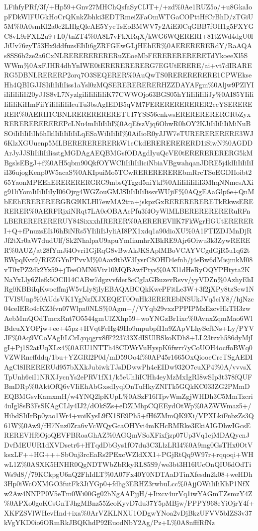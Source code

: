 \documentclass[]{article}
\begin{document}
LFihfyPRf/3f/+Hp59+Gnv27MHChQsfaSyCIJT+/+zd\%0Ae1RUZ5o/+u8GkaIopFDkWlFUGkHoCrQKnkZbhki3EDTRmeiZFaOmWTGaCOPttHfCrBhD/zTGiU5M\%0A0smKl2a0c2LHlgQleAE5YycTsEoBMWV7y2AiEi0CqGBB7fOH1g5FXYGC8vL9rFXL2u9+L0/tnZT4\%0A8L7vFkXRqX/kWG6WQERERI+81tZWd4dgU0lJiUv76zyT53Hx9ddfuzsEIiIi6gZRFGEwGLjHEhER\%0AERERERERdY/RaAQAs8SS6b2ze2a6CxNLRERERERERERuZEoeMbFERERERERERETdYkoeeXl5SWWm\%0AxFJHR4dbYnIWE0tERERERERERG7EGUtERERE/ai+vt7dIRARERG5DBNLRERERP2orq7O3SEQERER\%0AuQwTS0RERERERERE1CPWEkseHh4QBIGJJSIiIiIiIiIiss1aYsl0zMQSERERERERERHZZDAYAFgm\%0Aljw9PZlYIiIiIiIiIiIi20yJJS8vL7NyzlgiIiIiIiIiIiK77CWWOjo63BGS05hYIiIiIiIiIiJy\%0AI85YIiIiIiIiIiKiHmFiiYiIiIiIiIiIeuTu3bsAgIEDB5qVM7FERERERERERER2ccYSERERERER\%0AERH1CBNLRERERERERETUI7YSS56enkwsERERERERERGRbZyxREREREREREREPcLNu4mIiIiIiIiI\%0AqEfszVjq6OhwR0hOY2KJiIiIiIiIiMiNuBSOiIiIiIiIiIh6hIklIiIiIiIiIiLqESaWiIiIiIiI\%0AiIioR0yJJW7eTURERERERERE3WJ6KlzXGUuenp5MLBERERERERERkW1cCkdERERERERERD1iSiwN\%0AGDDArJyJJSIiIiIiIiIisstgMGDAgAEQBMGsfODAgdIyuQcVE0tERERERERERG5kMBgslsEBgJ+f\%0AH5qbm90QkfOYWCIiIiIiIiIiciNbiaVBgwahqanJDRE5j4klIiIiIiIiIiI36ujogKenp0W5acaS\%0AKIpuiMo5TCwREREREREREbmRrcTSoEGDIIoibt265YaonMPEEhERERERERGRG9mbsQTggd5niYkl\%0AIiIiIiIiIiI3MhqNNmcsAXig91liYomIiIiIiIiIyI06Ojrg4WGZouGMJSIiIiIiIiIissvWUjiF\%0AQgEAaGlp6e+QnMbEEhERERERERGRG9lKLHl7ewMA2tra+jskpzGxRERERERERETkRkwsERERERER\%0AERFRjxiNRqt7LA0cOBAAcPfu3f4OyWlMLBERERERERERuRFnLBERERERERERUY84SixxxhIRERER\%0AEREREVllK7FkWgrHGUtERERERI+Q+fPnuzsEIiJ6hBiNRs5YIiIiIiJyliAI8PX1xdq1a90dioXU\%0A1FTIZDJMnDjRJf2tXr0aW7dudUlf/Sk2NhalpaU9apuYmIiamhrXBkRE9Ajr6Oiwu3k3ZywRERER\%0AUZ/at28fYmJi4Ovri1GjRqG8vBwAkJKSAplMBoVCAYVCgdGjR5u1q62tRWpqKvz9/REZGYnPPvvM\%0Aav9tbW3IysrC8OHD4efnh/j4eBw6dMisjmkM08vT0xPZ2dk2Yz59+jTeeOMN6Viv10MQBAwfPtys\%0AXl1dHeRyOQYPHtyta2KNaYxLly6Zlefk5OCll14CABw7dgzvvfder8cCgIaGBuzevRsvv/yyVDZn\%0AzhyEhIRg0KBBiIqKwocffmjW5vLly8jIyEBAQABCQkKwePFitLe3W+3f2jXPy8tzSew1NTVISUnp\%0AUdsVK1YgNzfXJXEQET0OuHk3EREREblNSUkJVq5ciY8//hjNzc04ceIERo4cKZ3fvn07Wlpa0NLS\%0Agm+//VYqb29vxzPPPIPMzEzcvHkTH3zwAebMmQOdTmcxRnt7O5544gmUlZXhp59+woYNGzBr1ixc\%0AvnxZqmMao6WlBdeuXYOPjw+ee+45pz+HVqtFeHg49Ho9mpubpfI1a9ZApVLhySeftNs+Ly/PYVJF\%0Aq9VCoVAgIiLCrLyqqgrx8fF223733XdISUlBSkoKDh8+LL23tzxh586dyMjIgI+Pj1S2atUqXLx4\%0AEU1NTTh48CDWrVuHyspK6fwrr7yCoUOH4ocffoBWq0VZWRneffddq/1bu+YZGRl2P0d/mD59Oo4f\%0AP45r1665OxQiooeCrcTSgAEDIAgCl8IRERERUd957bXXkJubiwkTJsDDwwPh4eEIDw932O7cuXP4\%0A/vvvsXTpUnh6eiI1NRXJycnYs2ePRV1fX1/k5eUhIiICHh4eyMzMxIgRI8wSIp3t378fQUFBmDRp\%0AktOfQ6vVIiEhAbGxsdIyqlOnTuHkyZNITk5GQkKC033ZG2PMmDEQBMGsvKamxmH/w4YNQ2lpKUpL\%0ASzF16lTpvWmZgjWHDh3C5MmTzcri4uIgl8sB3FsSKAgCLly4IJ2/dOkSZs+eDZlMhpCQEEydOtWp\%0AZWWmaz5+/HibdSIiIrBp0yao1Wr4+voiKysL9fX1SE9Ph5+fH6ZMmQK9Xi/VPXLkiFnbzZs3Q61W\%0Aw9/fH7Nnz0Zra6vVcWQyGcaOHYvi4mKHcRMRke3EkiAIGDhwIGcsEREREVHf6OjoQEVFBRoaGhAZ\%0AGQmVSoXFixfjzp07Up3Vq1cjMDAQycnJDvfMEUUR1dXVDsetr6+HTqdDbGys1fO7du3C3LlzLRI4\%0A9mg0GsTHx0OtVksxLF++HG+++SbOnj3rcEaRs2PExcWZldXX1+PGjRtQq9W97r+rqqoqi+WHwL1Z\%0ASXK5HNHR0QgNDTWbZbRkyRL85S9/we3bt3H16lUcOnQIU6dOdTiWs9d8//79KCkpgU6nQ2FhIdLT\%0A07Fx40Y0NDTAaDTinXfesdn2k08+weHDh3Hp0iWcOXMGO3futFk3JiYGp0+fdhg3ERHZ3rwbuLcc\%0AjjOWiIiIiKhP1NfXw2Aw4NNPP0V5eTm0Wi00Gg02bNgAAPjjH/+Iixcv4urVq1iwYAGmTZsmzY4Z\%0APXo0goKCsGnTJhgMBnz55ZcoKyvD7du37Y5pMBjw/PPPY968eYiOjrY4f+XKFZSVlWHevHnd+ixa\%0ArVZKLNXU1ODgwYNoa2vDjBkzUFVV5bIZS3v37kVgYKD0io6ORmRkJBQKhdP92EuodNbY2Ag/Pz+L\%0A8nfffRfNz
\end{document}
